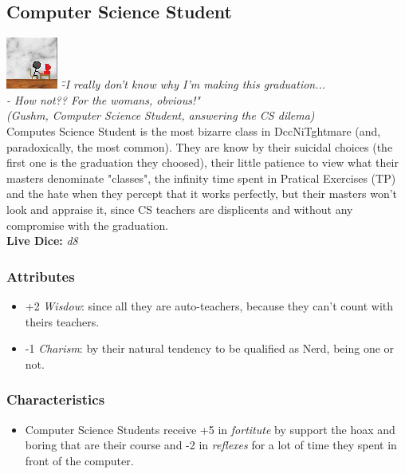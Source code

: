 \documentclass[ letterpaper,12pt]{article}
\begin{document}
\subsection{Computer Science Student}
\includegraphics{../data/classes/Img/dcc.png}
{\it 
\"-I really don't know why I'm making this graduation...\\
- How not?? For the womans, obvious!"\\
(Gushm, Computer Science Student, answering the CS dilema)}\\

Computes Science Student is the most bizarre class in DccNiTghtmare (and,
paradoxically, the most common). They are know by their suicidal choices (the
first one is the graduation they choosed), their little patience to view what
their masters denominate "classes", the infinity time spent in Pratical
Exercises (TP) and the hate when they percept that it works perfectly, but their
masters won't look and appraise it, since CS teachers are displicents and
without any compromise with the graduation.\\

{\bf Live Dice:} {\it d8}

\subsubsection{Attributes}
\begin{itemize}
\item{+2 {\it Wisdow}: since all they are auto-teachers, because they can't count with theirs teachers.}
\item{-1 {\it Charism}: by their natural tendency to be qualified as Nerd, being one or not.}
\end{itemize}

\subsubsection{Characteristics}
\begin{itemize}
\item{Computer Science Students receive +5 in {\it fortitute} by support the hoax and boring that are their course and -2 in {\it reflexes} for a lot of time they spent in front of the computer.}
\end{itemize}
\end{document}

